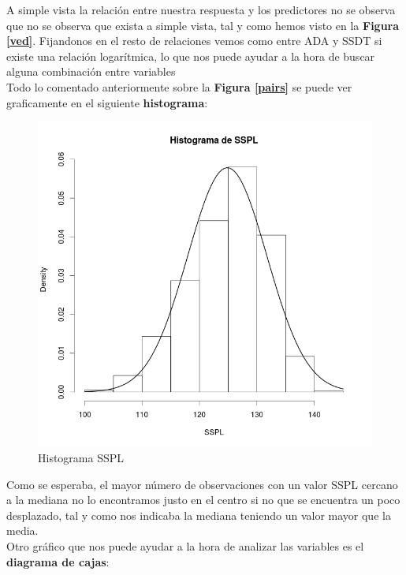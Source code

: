 A simple vista la relación entre nuestra respuesta y los predictores no se observa que no se observa que exista a simple vista, tal y como hemos visto en la \textbf{Figura \ref{ved}}. Fijandonos en el resto de relaciones vemos como entre ADA y SSDT si existe una relación logarítmica, lo que nos puede ayudar a la hora de buscar alguna combinación entre variables\\
	
Todo lo comentado anteriormente sobre la \textbf{Figura \ref{pairs}} se puede ver graficamente en el siguiente \textbf{histograma}:
	
	\begin{figure}[H]
\centering
\includegraphics[scale=0.45]{HistogramaSSPL.png}
\caption{Histograma SSPL}
\label{}
\end{figure}

Como se esperaba, el mayor número de observaciones con un valor SSPL cercano a la mediana no lo encontramos justo en el centro si no que se encuentra un poco desplazado, tal y como nos indicaba la mediana teniendo un valor mayor que la media.\\

Otro gráfico que nos puede ayudar a la hora de analizar las variables es el \textbf{diagrama de cajas}:


